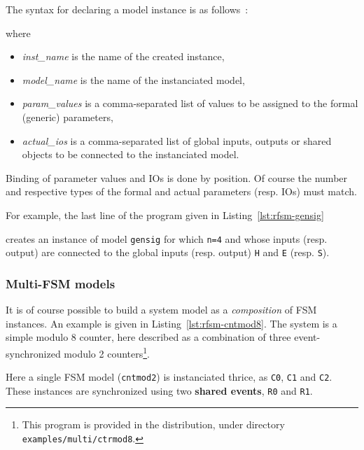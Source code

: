\medskip
The syntax for declaring a model instance is as follows~:

\begin{center}
\end{center}

where
\begin{itemize}
\item \emph{inst\_name} is the name of the created instance,
\item \emph{model\_name} is the name of the instanciated model,
\item \emph{param\_values} is a comma-separated list of values to be assigned to the formal
  (generic) parameters,
\item \emph{actual\_ios} is a comma-separated list of global inputs, outputs or shared objects to be
  connected to the instanciated model.
\end{itemize}

Binding of parameter values and IOs is done by position. Of course the number and respective types
of the formal and actual parameters (resp. IOs) must match.

\medskip
For example, the last line of the program given in Listing~\ref{lst:rfsm-gensig}

\begin{center}
\end{center}

creates an instance of model \verb|gensig| for which \verb|n=4| and whose inputs (resp. output) are
connected to the global inputs (resp. output) \texttt{H} and \texttt{E} (resp. \texttt{S}).

\subsubsection*{Multi-FSM models}
\label{sec:multi-fsm-models}

It is of course possible to build a system model as a \emph{composition} of FSM instances.  An
example is given in Listing~\ref{lst:rfsm-cntmod8}. The system is a simple modulo 8 counter, here
described as a combination of three event-synchronized modulo 2 counters\footnote{This program is
  provided in the distribution, under directory \texttt{examples/multi/ctrmod8}.}.

\medskip
Here a single FSM model (\texttt{cntmod2}) is instanciated thrice, as \texttt{C0}, \texttt{C1} and
\texttt{C2}. These instances are synchronized using two \textbf{shared events}, \texttt{R0} and \texttt{R1}. 

